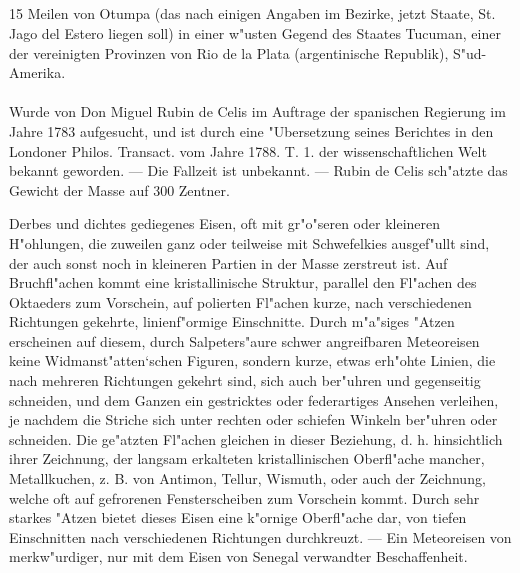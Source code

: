 \documentclass[a4paper, 11pt, oneside, polutonikogreek, german]{article}
\begin{document}
\setlength{\leftskip}{0pt}
\setlength{\parindent}{20pt}

\subsection[\swabfamily {Tucuman.}]{}
\begin{center}

15 Meilen von Otumpa (das nach einigen Angaben im Bezirke, jetzt Staate, St. Jago del Estero liegen soll) in einer w"usten Gegend des Staates Tucuman, einer der vereinigten Provinzen von Rio de la Plata (argentinische Republik), S"ud-Amerika.
\end{center}
\paragraph{}
Wurde von Don Miguel Rubin de Celis im Auftrage der spanischen Regierung im Jahre 1783 aufgesucht, und ist durch eine "Ubersetzung seines Berichtes in den Londoner Philos. Transact. vom Jahre 1788. T. 1. der wissenschaftlichen Welt bekannt geworden. --- Die Fallzeit ist unbekannt. --- Rubin de Celis sch"atzte das Gewicht der Masse auf 300 Zentner.

Derbes und dichtes gediegenes Eisen, oft mit gr"o"seren oder kleineren H"ohlungen, die zuweilen ganz oder teilweise mit Schwefelkies ausgef"ullt sind, der auch sonst noch in kleineren Partien in der Masse zerstreut ist. Auf Bruchfl"achen kommt eine kristallinische Struktur, parallel den Fl"achen des Oktaeders zum Vorschein, auf polierten Fl"achen kurze, nach verschiedenen Richtungen gekehrte, linienf"ormige Einschnitte. Durch m"a"siges "Atzen erscheinen auf diesem, durch Salpeters"aure schwer angreifbaren Meteoreisen keine Widmanst"atten‘schen Figuren, sondern kurze, etwas erh"ohte Linien, die nach mehreren Richtungen gekehrt sind, sich auch ber"uhren und gegenseitig schneiden, und dem Ganzen ein gestricktes oder federartiges Ansehen verleihen, je nachdem die Striche sich unter rechten oder schiefen Winkeln ber"uhren oder schneiden. Die ge"atzten Fl"achen gleichen in dieser Beziehung, d. h. hinsichtlich ihrer Zeichnung, der langsam erkalteten kristallinischen Oberfl"ache mancher, Metallkuchen, z. B. von Antimon, Tellur, Wismuth, oder auch der Zeichnung, welche oft auf gefrorenen Fensterscheiben zum Vorschein kommt. Durch sehr starkes "Atzen bietet dieses Eisen eine k"ornige Oberfl"ache dar, von tiefen Einschnitten nach verschiedenen Richtungen durchkreuzt. --- Ein Meteoreisen von merkw"urdiger, nur mit dem Eisen von Senegal verwandter Beschaffenheit.
\end{document}
